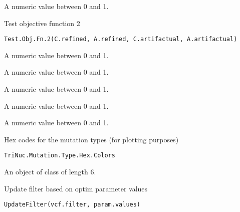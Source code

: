 \documentclass[letterpaper]{book}
\begin{document}
%
\begin{Value}
A numeric value between 0 and 1.
\end{Value}
%
\begin{Description}\relax
Test objective function 2
\end{Description}
%
\begin{Usage}
\begin{verbatim}
Test.Obj.Fn.2(C.refined, A.refined, C.artifactual, A.artifactual)
\end{verbatim}
\end{Usage}
%
\begin{Arguments}
\begin{ldescription}
\item[\code{C.refined}] A numeric value between 0 and 1.

\item[\code{A.refined}] A numeric value between 0 and 1.

\item[\code{C.artifactual}] A numeric value between 0 and 1.

\item[\code{A.artifactual}] A numeric value between 0 and 1.
\end{ldescription}
\end{Arguments}
%
\begin{Value}
A numeric value between 0 and 1.
\end{Value}
%
\begin{Description}\relax
Hex codes for the mutation types (for plotting purposes)
\end{Description}
%
\begin{Usage}
\begin{verbatim}
TriNuc.Mutation.Type.Hex.Colors
\end{verbatim}
\end{Usage}
%
\begin{Format}
An object of class  of length 6.
\end{Format}
%
\begin{Description}\relax
Update filter based on optim parameter values
\end{Description}
%
\begin{Usage}
\begin{verbatim}
UpdateFilter(vcf.filter, param.values)
\end{verbatim}
\end{Usage}
\end{document}
